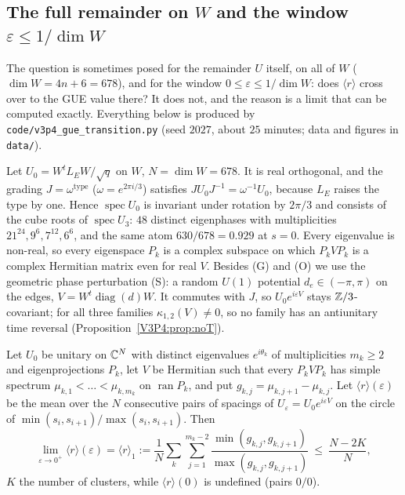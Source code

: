 \subsection*{The full remainder on $W$ and the window $\varepsilon\le1/\dim W$}

The question is sometimes posed for the remainder $U$ itself, on all of $W$ ($\dim W=4n+6=678$),
and for the window $0\le\varepsilon\le1/\dim W$: does $\langle r\rangle$ cross over to the GUE value
there? It does not, and the reason is a limit that can be computed exactly. Everything below is
produced by \texttt{code/v3p4\_gue\_transition.py} (seed $2027$, about $25$ minutes; data and figures
in \texttt{data/}).

Let $U_0=W^{t}L_EW/\sqrt q$ on $W$, $N=\dim W=678$. It is real orthogonal, and the grading
$J=\omega^{\mathrm{type}}$ ($\omega=e^{2\pi i/3}$) satisfies $JU_0J^{-1}=\omega^{-1}U_0$, because
$L_E$ raises the type by one. Hence $\operatorname{spec}U_0$ is invariant under rotation by
$2\pi/3$ and consists of the cube roots of $\operatorname{spec}U_3$: $48$ distinct eigenphases with
multiplicities $21^{24},9^{6},7^{12},6^{6}$, and the same atom $630/678=0.929$ at $s=0$. Every
eigenvalue is non-real, so every eigenspace $P_k$ is a complex subspace on which $P_kVP_k$ is a
complex Hermitian matrix even for real $V$. Besides (G) and (O) we use the geometric phase
perturbation (S): a random $U(1)$ potential $d_e\in(-\pi,\pi)$ on the edges, $V=W^{t}\operatorname{diag}(d)W$.
It commutes with $J$, so $U_0e^{i\varepsilon V}$ stays $\mathbb{Z}/3$-covariant; for all three families
$\kappa_{1,2}(V)\ne0$, so no family has an antiunitary time reversal
(Proposition~\ref{V3P4:prop:noT}).

\begin{proposition}\label{V3P4:prop:plateau}
Let $U_0$ be unitary on $\mathbb{C}^{N}$ with distinct eigenvalues $e^{i\theta_k}$ of multiplicities
$m_k\ge2$ and eigenprojections $P_k$, let $V$ be Hermitian such that every $P_kVP_k$ has simple
spectrum $\mu_{k,1}<\dots<\mu_{k,m_k}$ on $\operatorname{ran}P_k$, and put
$g_{k,j}=\mu_{k,j+1}-\mu_{k,j}$. Let $\langle r\rangle(\varepsilon)$ be the mean over the $N$
consecutive pairs of spacings of $U_\varepsilon=U_0e^{i\varepsilon V}$ on the circle of
$\min(s_i,s_{i+1})/\max(s_i,s_{i+1})$. Then
\[
\lim_{\varepsilon\to0^{+}}\langle r\rangle(\varepsilon)=\langle r\rangle_1:=\frac1N\sum_k
\sum_{j=1}^{m_k-2}\frac{\min(g_{k,j},g_{k,j+1})}{\max(g_{k,j},g_{k,j+1})}
\ \le\ \frac{N-2K}{N},
\]
$K$ the number of clusters, while $\langle r\rangle(0)$ is undefined (pairs $0/0$).
\end{proposition}


